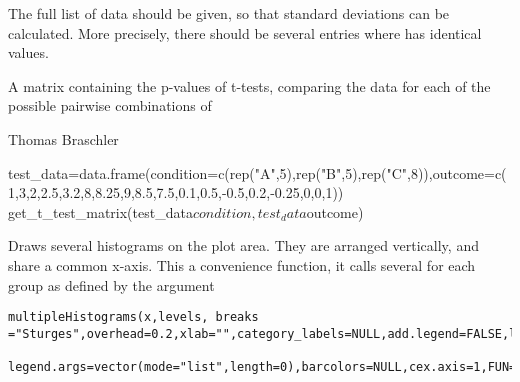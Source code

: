 \documentclass[a4paper]{book}
\begin{document}
%
\begin{Details}\relax
The full list of data should be given, so that standard deviations can be calculated. More precisely, there should be several entries where  has identical values.
\end{Details}
%
\begin{Value}
A matrix containing the p-values of t-tests, comparing the data for each of the possible pairwise combinations of 
\end{Value}
%
\begin{Author}\relax
Thomas Braschler
\end{Author}
%
\begin{Examples}
\begin{ExampleCode}
test_data=data.frame(condition=c(rep("A",5),rep("B",5),rep("C",8)),outcome=c(1,3,2,2.5,3.2,8,8.25,9,8.5,7.5,0.1,0.5,-0.5,0.2,-0.25,0,0,1))
get_t_test_matrix(test_data$condition,test_data$outcome)
\end{ExampleCode}
\end{Examples}
%
\begin{Description}\relax
Draws several histograms on the plot area. They are arranged vertically, and share a common x-axis. This a convenience function, it calls several  for each group as defined by the argument 
\end{Description}
%
\begin{Usage}
\begin{verbatim}
multipleHistograms(x,levels, breaks ="Sturges",overhead=0.2,xlab="",category_labels=NULL,add.legend=FALSE,legend.text=NULL,
	legend.args=vector(mode="list",length=0),barcolors=NULL,cex.axis=1,FUN=NULL,...)
\end{verbatim}
\end{Usage}
%
\end{document}
